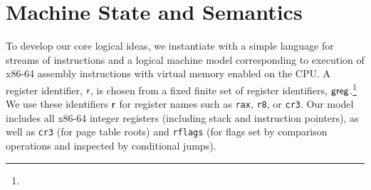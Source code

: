 \section{Machine State and Semantics}
\label{sec:syntax}
To develop our core logical ideas, we instantiate \iris with a simple language for streams of instructions
and a logical machine model corresponding to execution of x86-64 assembly instructions with virtual memory enabled on the
CPU.
%
A register identifier, $\mathsf{r}$, is chosen from a fixed finite set of register identifiers, $\mathsf{greg}$.\footnote{} 
We use these identifiers $\mathsf{r}$ for register names such as \lstinline|rax|, \lstinline|r8|, or \lstinline|cr3|. Our model includes
all x86-64 integer registers (including stack and instruction pointers), as well as \lstinline|cr3| (for page table roots) and \lstinline|rflags| (for
flags set by comparison operations and inspected by conditional jumps).
